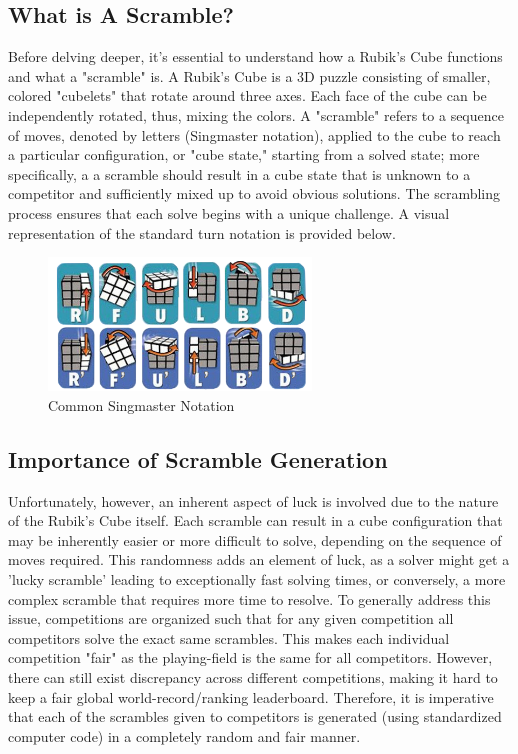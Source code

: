 \documentclass[12pt,letterpaper]{article}
\numberwithin{equation}{section}
\begin{document}
\subsection{What is A Scramble?}

Before delving deeper, it's essential to understand how a Rubik's Cube functions and what a "scramble" is. A Rubik's Cube is a 3D puzzle consisting of smaller, colored "cubelets" that rotate around three axes. Each face of the cube can be independently rotated, thus, mixing the colors. A "scramble" refers to a sequence of moves, denoted by letters (Singmaster notation), applied to the cube to reach a particular configuration, or "cube state," starting from a solved state; more specifically, a a scramble should result in a cube state that is unknown to a competitor and sufficiently mixed up to avoid obvious solutions. The scrambling process ensures that each solve begins with a unique challenge. A visual representation of the standard turn notation is provided below. 

	\begin{figure}[H]
		\centering
		 \includegraphics[width=2.75in]{complete-cube-notations.png}
		 \caption{Common Singmaster Notation}
		 \label{fig:turn_notation}
	\end{figure}

\subsection{Importance of Scramble Generation}
Unfortunately, however, an inherent aspect of luck is involved due to the nature of the Rubik's Cube itself. Each scramble can result in a cube configuration that may be inherently easier or more difficult to solve, depending on the sequence of moves required. This randomness adds an element of luck, as a solver might get a 'lucky scramble' leading to exceptionally fast solving times, or conversely, a more complex scramble that requires more time to resolve. To generally address this issue, competitions are organized such that for any given competition all competitors solve the exact same scrambles. This makes each individual competition "fair" as the playing-field is the same for all competitors. However, there can still exist discrepancy across different competitions, making it hard to keep a fair global world-record/ranking leaderboard. Therefore, it is imperative that each of the scrambles given to competitors is generated (using standardized computer code) in a completely random and fair manner.
\end{document}
